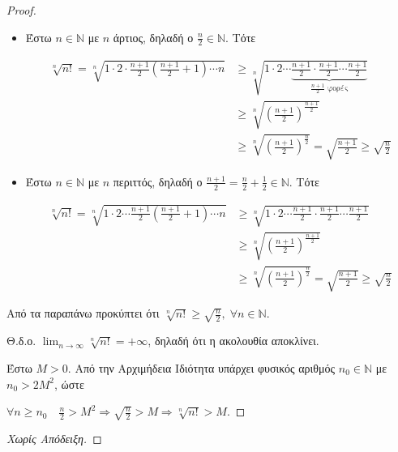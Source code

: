 \documentclass[main.tex]{subfiles}
\begin{document}
\begin{proof}
\item {}
  \begin{itemize}
    \item 
      Έστω $ n \in \mathbb{N} $ με $ n $ άρτιος, δηλαδή ο 
      $ \frac{n}{2} \in \mathbb{N} $. Τότε

      \begin{align*}
        \sqrt[n]{n!} = \sqrt[n]{1 \cdot 2 \cdot \frac{n+1}{2}
        \left(\frac{n+1}{2} +1\right) \cdots n} 
                    &\geq \sqrt[n]{1\cdot 2 \cdots
                      \underbrace{\frac{n+1}{2} \cdot \frac{n+1}{2} 
                        \cdots \frac{n+1}{2}}_{\frac{n+1}{2} \; 
                    \text{φορές}}} \\
                    &\geq \sqrt[n]{\left(\frac{n+1}{2}\right)^
                    {\frac{n+1}{2}}} \\ 
                    &\geq \sqrt[n]{\left(\frac{n+1}{2}\right)^
                    {\frac{n}{2}}} = \sqrt{ \frac{n+1}{2} } \geq 
                    \sqrt{\frac{n}{2}} 
      \end{align*} 

    \item Έστω $ n \in \mathbb{N} $ με $ n $ περιττός, δηλαδή ο $
      \frac{n+1}{2} = \frac{n}{2} + \frac{1}{2} \in \mathbb{N} $.
      Τότε

      \begin{align*}
        \sqrt[n]{n!} = \sqrt[n]{1\cdot 2 \cdots \frac{n+1}{2}
        \left(\frac{n+1}{2} +1\right) \cdots n}
             &\geq \sqrt[n]{1 \cdot 2 \cdots
             \frac{n+1}{2}  \cdot \frac{n+1}{2} \cdots \frac{n+1}{2} } \\ 
             &\geq 
             \sqrt[n]{\left(\frac{n+1}{2} \right)^{\frac{n+1}{2}}} \\ 
             & \geq
             \sqrt[n]{\left(\frac{n+1}{2} \right)^{\frac{n}{2}}} = 
             \sqrt{\frac{n+1}{2}} \geq 
             \sqrt{\frac{n}{2}}
      \end{align*}
  \end{itemize}

  Από τα παραπάνω προκύπτει ότι $ \sqrt[n]{n!} \geq \sqrt{\frac{n}{2}
  }, \; \forall n \in \mathbb{N} $. 

  Θ.δ.ο. $ \lim_{n \to \infty} \sqrt[n]{n!} = + \infty $, 
  δηλαδή ότι η ακολουθία αποκλίνει.

  Έστω $ M >0 $. Από την Αρχιμήδεια Ιδιότητα υπάρχει 
  φυσικός αριθμός $ 
  n_{0} \in  \mathbb{N} $ με $ n_{0}>2M^{2} $, ώστε 

  $ \forall n \geq n_{0} \quad \frac{n}{2} > M^{2} \Rightarrow
  \sqrt{\frac{n}{2}} > M \Rightarrow \sqrt[n]{n!} > M $. 
\end{proof}




\begin{proof}[Χωρίς Απόδειξη]

\end{proof}
\end{document}
